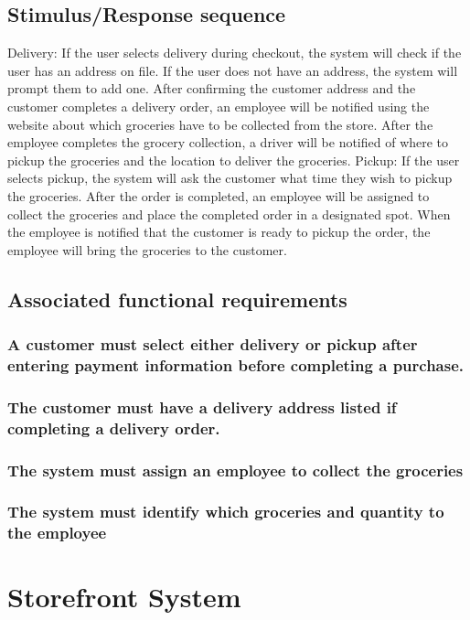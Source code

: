 \documentclass{scrreprt}
\begin{document}
\subsection{Stimulus/Response sequence}
Delivery: If the user selects delivery during checkout, the system will check if the user has an address on file.  If the user does not have an address, the system will prompt them to add one.  After confirming the customer address and the customer completes a delivery order, an employee will be notified using the website about which groceries have to be collected from the store.  After the employee completes the grocery collection, a driver will be notified of where to pickup the groceries and the location to deliver the groceries.
Pickup: If the user selects pickup, the system will ask the customer what time they wish to pickup the groceries.  After the order is completed, an employee will be assigned to collect the groceries and place the completed order in a designated spot.  When the employee is notified that the customer is ready to pickup the order, the employee will bring the groceries to the customer.

\subsection{Associated functional requirements}
\subsubsection[]{\normalfont A customer must select either delivery or pickup after entering payment information before completing a purchase.}
\subsubsection[]{\normalfont The customer must have a delivery address listed if completing a delivery order.}
\subsubsection[]{\normalfont The system must assign an employee to collect the groceries}
\subsubsection[]{\normalfont The system must identify which groceries and quantity to the employee}

\section{Storefront System}
\end{document}

